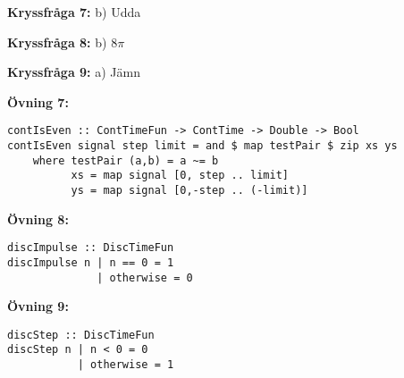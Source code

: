 \documentclass{article}
\begin{document}
\textbf{Kryssfråga 7:} b) Udda

\textbf{Kryssfråga 8:} b) $8\pi$

\textbf{Kryssfråga 9:} a) Jämn

\textbf{Övning 7:}
\begin{verbatim}
contIsEven :: ContTimeFun -> ContTime -> Double -> Bool
contIsEven signal step limit = and $ map testPair $ zip xs ys
    where testPair (a,b) = a ~= b
          xs = map signal [0, step .. limit]
          ys = map signal [0,-step .. (-limit)]
\end{verbatim}
\textbf{Övning 8:}
\begin{verbatim}
discImpulse :: DiscTimeFun
discImpulse n | n == 0 = 1
              | otherwise = 0
\end{verbatim}
\textbf{Övning 9:}
\begin{verbatim}
discStep :: DiscTimeFun
discStep n | n < 0 = 0
           | otherwise = 1
\end{verbatim}
\end{document}

